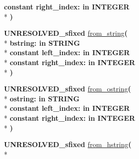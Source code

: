 \begin{DoxyCompactItemize}
{\bfseries {\bfseries \textcolor{keywordflow}{constant}\textcolor{vhdlchar}{ }}\textcolor{vhdlchar}{right\+\_\+index\+: }\textcolor{stringliteral}{in }{\bfseries \textcolor{comment}{I\+N\+T\+E\+G\+E\+R}\textcolor{vhdlchar}{ }}}\\*
{\bfseries  )} 
\item 
{\bfseries {\bfseries \textcolor{vhdlchar}{U\+N\+R\+E\+S\+O\+L\+V\+E\+D\+\_\+sfixed}\textcolor{vhdlchar}{ }}} \hyperlink{class__fixed__pkg_a593418ad4a048a688bec13ffd5de25ce}{from\+\_\+string}{\bfseries  ( }\\*
{\bfseries \textcolor{vhdlchar}{bstring\+: }\textcolor{stringliteral}{in }{\bfseries \textcolor{comment}{S\+T\+R\+I\+N\+G}\textcolor{vhdlchar}{ }}}\\*
{\bfseries {\bfseries \textcolor{keywordflow}{constant}\textcolor{vhdlchar}{ }}\textcolor{vhdlchar}{left\+\_\+index\+: }\textcolor{stringliteral}{in }{\bfseries \textcolor{comment}{I\+N\+T\+E\+G\+E\+R}\textcolor{vhdlchar}{ }}}\\*
{\bfseries {\bfseries \textcolor{keywordflow}{constant}\textcolor{vhdlchar}{ }}\textcolor{vhdlchar}{right\+\_\+index\+: }\textcolor{stringliteral}{in }{\bfseries \textcolor{comment}{I\+N\+T\+E\+G\+E\+R}\textcolor{vhdlchar}{ }}}\\*
{\bfseries  )} 
\item 
{\bfseries {\bfseries \textcolor{vhdlchar}{U\+N\+R\+E\+S\+O\+L\+V\+E\+D\+\_\+sfixed}\textcolor{vhdlchar}{ }}} \hyperlink{class__fixed__pkg_a13b6ef359fc5a25e37e6867e6b36629c}{from\+\_\+ostring}{\bfseries  ( }\\*
{\bfseries \textcolor{vhdlchar}{ostring\+: }\textcolor{stringliteral}{in }{\bfseries \textcolor{comment}{S\+T\+R\+I\+N\+G}\textcolor{vhdlchar}{ }}}\\*
{\bfseries {\bfseries \textcolor{keywordflow}{constant}\textcolor{vhdlchar}{ }}\textcolor{vhdlchar}{left\+\_\+index\+: }\textcolor{stringliteral}{in }{\bfseries \textcolor{comment}{I\+N\+T\+E\+G\+E\+R}\textcolor{vhdlchar}{ }}}\\*
{\bfseries {\bfseries \textcolor{keywordflow}{constant}\textcolor{vhdlchar}{ }}\textcolor{vhdlchar}{right\+\_\+index\+: }\textcolor{stringliteral}{in }{\bfseries \textcolor{comment}{I\+N\+T\+E\+G\+E\+R}\textcolor{vhdlchar}{ }}}\\*
{\bfseries  )} 
\item 
{\bfseries {\bfseries \textcolor{vhdlchar}{U\+N\+R\+E\+S\+O\+L\+V\+E\+D\+\_\+sfixed}\textcolor{vhdlchar}{ }}} \hyperlink{class__fixed__pkg_a10a9883c71bef33c1cdb7889520f1c36}{from\+\_\+hstring}{\bfseries  ( }\\*

\end{DoxyCompactItemize}
